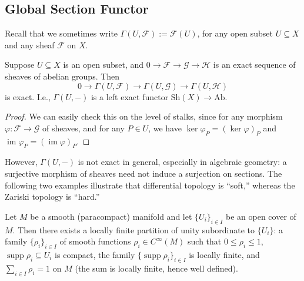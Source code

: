 \documentclass[11pt]{article}
\newcommand{\im}{\operatorname{im}}
\begin{document}
\subsection{Global Section Functor}

Recall that we sometimes write $ \Gamma(U,\mathscr{F}):= \mathscr{F}(U)$, 
for any open subset $ U \subseteq X $ and any sheaf $ \mathscr{F} $ on $ X $. 

\begin{proposition}
  \label{prop: left-exactness of Gamma}
    \cite[Ex 1.8]{hartsAG} 
    Suppose $U \subseteq X$ is an open subset, 
    and $0 \to \mathscr{F} \to \mathscr{G} \to \mathscr{H}$ is an exact sequence 
    of sheaves of abelian groups. 
    Then $$0 \to \Gamma(U,\mathscr{F}) \to \Gamma(U,\mathscr{G}) \to \Gamma(U,\mathscr{H})$$
    is exact. I.e., $ \Gamma(U,-) $  is a left exact functor $\mathrm{Sh}(X) \to \mathrm{Ab}$. 
\end{proposition}

\begin{proof}
  We can easily check this on the level of stalks, 
  since for any morphism $ \varphi: \mathscr{F} \to \mathscr{G} $ of sheaves, 
  and for any $ P \in U $, we have $ \ker \varphi_{P} = (\ker \varphi)_{P} $ and 
  $ \im \varphi_{P} = (\im \varphi)_{P} $.  
\end{proof}

However, $ \Gamma(U,-) $ is not exact in general, especially in algebraic geometry:
a surjective morphism of sheaves need not induce a surjection on sections. 
The following two examples illustrate that differential topology is ``soft,'' 
whereas the Zariski topology is ``hard.'' 

\begin{lemma}
  \label{lemma: partition of units}
  Let $ M $ be a smooth (paracompact) manifold and let $ \{U_{i}\}_{i \in I} $ be an open cover of $ M $. 
  Then there exists a locally finite partition of unity subordinate to $ \{U_{i}\} $: 
  a family $ \{\rho_{i}\}_{i \in I} $ of smooth functions $ \rho_{i} \in C^{\infty}(M) $ such that 
  $ 0 \le \rho_{i} \le 1 $, $ \operatorname{supp}\rho_{i} \subseteq U_{i} $ is compact, 
  the family $ \{\operatorname{supp}\rho_{i}\}_{i \in I} $ is locally finite, and 
  $ \sum_{i \in I} \rho_{i} = 1 $ on $ M $ (the sum is locally finite, hence well defined).
\end{lemma}
\end{document}
